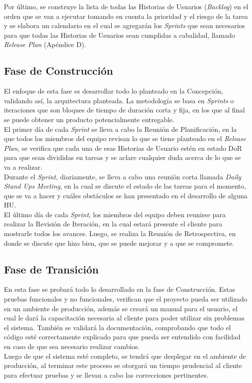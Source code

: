 Por último, se construye la lista de todas las Historias de Usuarios (\textit{Backlog}) en el orden que se van a ejecutar tomando en cuenta la prioridad y el riesgo de la tarea y se elabora un calendario en el cual se agregarán los \textit{Sprints} que sean necesarios para que todas las Historias de Usuarios sean cumplidas a cabalidad, llamado \textit{Release Plan} (Apéndice D).


\subsection{Fase de Construcción}

El enfoque de esta fase es desarrollar todo lo planteado en la Concepción, validando así, la arquitectura planteada. La metodología se basa en \textit{Sprints} o iteraciones que son bloques de tiempo de duración corta y fija, en los que al final se puede obtener un producto potencialmente entregable. \\

El primer día de cada \textit{Sprint} se lleva a cabo la Reunión de Planificación, en la que todos los miembros del equipo revisan lo que se tiene planteado en el \textit{Release Plan}, se verifica que cada una de esas Historias de Usuario estén en estado DoR para que sean divididas en tareas y se aclare cualquier duda acerca de lo que se va a realizar. \\

Durante el \textit{Sprint}, diariamente, se lleva a cabo una reunión corta llamada \textit{Daily Stand Ups Meeting}, en la cual se discute el estado de las tareas para el momento, que se va a hacer y cuáles obstáculos se han presentado en el desarrollo de alguna HU.\\

El último día de cada \textit{Sprint}, los miembros del equipo deben reunirse para realizar la Revisión de Iteración, en la cual estará presente el cliente para mostrarle todos los avances. Luego, se realiza la Reunión de Retrospectiva, en donde se discute que hizo bien, que se puede mejorar y a que se compromete.

\subsection{Fase de Transición}

En esta fase se probará todo lo desarrollado en la fase de Construcción. Estas pruebas funcionales y no funcionales, verifican que el proyecto pueda ser utilizado en un ambiente de producción, además se creará un manual para el usuario, el cual le dará la capacitación necesaria al cliente para poder utilizar sin problemas el sistema. También se validará la documentación, comprobando que todo el código esté correctamente explicado para que pueda ser entendido con facilidad en caso de que sea necesario realizar cambios.\\

Luego de que el sistema esté completo, se tendrá que desplegar en el ambiente de producción, al terminar este proceso se otorgará un tiempo prudencial al cliente para efectuar pruebas y se llevan a cabo las correcciones pertinentes.

